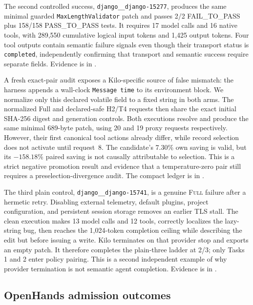 \documentclass[11pt]{article}
\begin{document}
The second controlled success, \texttt{django\_\_django-15277}, produces the
same minimal guarded \texttt{MaxLengthValidator} patch and passes 2/2
FAIL\_TO\_PASS plus 158/158 PASS\_TO\_PASS tests.  It requires 17 model
calls and 16 native tools, with 289,550 cumulative logical input tokens and
1,425 output tokens.  Four tool outputs contain semantic failure signals even
though their transport status is \texttt{completed}, independently confirming
that transport and semantic success require separate fields.  Evidence is in
.

A fresh exact-pair audit exposes a Kilo-specific source of false mismatch:
the harness appends a wall-clock \texttt{Message time} to its environment
block.  We normalize only this declared volatile field to a fixed string in
both arms.  The normalized Full and declared-safe H2/T4 requests then share
the exact initial SHA-256 digest and generation controls.  Both executions
resolve and produce the same minimal 689-byte patch, using 20 and 19 proxy
requests respectively.  However, their first canonical tool actions already
differ, while record selection does not activate until request~8.  The
candidate's 7.30\% own saving is valid, but its $-158.18$\% paired saving is
not causally attributable to selection.  This is a strict negative promotion
result and evidence that a temperature-zero pair still requires a
preselection-divergence audit.  The compact ledger is in
.

The third plain control, \texttt{django\_\_django-15741}, is a genuine
\textsc{Full} failure after a hermetic retry.  Disabling external telemetry,
default plugins, project configuration, and persistent session storage removes
an earlier TLS stall.  The clean execution makes 13 model calls and 12 tools,
correctly localizes the lazy-string bug, then reaches the 1,024-token completion
ceiling while describing the edit but before issuing a write.  Kilo terminates
on that provider stop and exports an empty patch.  It therefore completes the
plain-three ladder at 2/3; only Tasks 1 and 2 enter policy pairing.  This is a
second independent example of why provider termination is not semantic agent
completion.  Evidence is in
.

\subsection{OpenHands admission outcomes}
\end{document}
